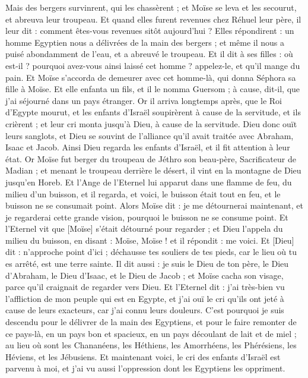 \begin{multicols}{2}
Mais des bergers survinrent, qui les chassèrent ; et Moïse se leva et les secourut, et abreuva leur troupeau.
Et quand elles furent revenues chez Réhuel leur père, il leur dit : comment êtes-vous revenues sitôt aujourd'hui ?
Elles répondirent : un homme Egyptien nous a délivrées de la main des bergers ; et même il nous a puisé abondamment de l'eau, et a abreuvé le troupeau.
Et il dit à ses filles : où est-il ? pourquoi avez-vous ainsi laissé cet homme ? appelez-le, et qu'il mange du pain.
Et Moïse s'accorda de demeurer avec cet homme-là, qui donna Séphora sa fille à Moïse.
Et elle enfanta un fils, et il le nomma Guersom ; à cause, dit-il, que j'ai séjourné dans un pays étranger.
Or il arriva longtemps après, que le Roi d'Egypte mourut, et les enfants d'Israël soupirèrent à cause de la servitude, et ils crièrent ; et leur cri monta jusqu'à Dieu, à cause de la servitude.
Dieu donc ouït leurs sanglots, et Dieu se souvint de l'alliance qu'il avait traitée avec Abraham, Isaac et Jacob.
Ainsi Dieu regarda les enfants d'Israël, et il fit attention à leur état.
\VerseOne{}Or Moïse fut berger du troupeau de Jéthro son beau-père, Sacrificateur de Madian ; et menant le troupeau derrière le désert, il vint en la montagne de Dieu jusqu'en Horeb.
Et l'Ange de l'Eternel lui apparut dans une flamme de feu, du milieu d'un buisson, et il regarda, et voici, le buisson était tout en feu, et le buisson ne se consumait point.
Alors Moïse dit : je me détournerai maintenant, et je regarderai cette grande vision, pourquoi le buisson ne se consume point.
Et l'Eternel vit que [Moïse] s'était détourné pour regarder ; et Dieu l'appela du milieu du buisson, en disant : Moïse, Moïse ! et il répondit : me voici.
Et [Dieu] dit : n'approche point d'ici ; déchausse tes souliers de tes pieds, car le lieu où tu es arrêté, est une terre sainte.
Il dit aussi : je suis le Dieu de ton père, le Dieu d'Abraham, le Dieu d'Isaac, et le Dieu de Jacob ; et Moïse cacha son visage, parce qu'il craignait de regarder vers Dieu.
Et l'Eternel dit : j'ai très-bien vu l'affliction de mon peuple qui est en Egypte, et j'ai ouï le cri qu'ils ont jeté à cause de leurs exacteurs, car j'ai connu leurs douleurs.
C'est pourquoi je suis descendu pour le délivrer de la main des Egyptiens, et pour le faire remonter de ce pays-là, en un pays bon et spacieux, en un pays découlant de lait et de miel ; au lieu où sont les Chananéens, les Héthiens, les Amorrhéens, les Phérésiens, les Héviens, et les Jébusiens.
Et maintenant voici, le cri des enfants d'Israël est parvenu à moi, et j'ai vu aussi l'oppression dont les Egyptiens les oppriment.

\end{multicols}
